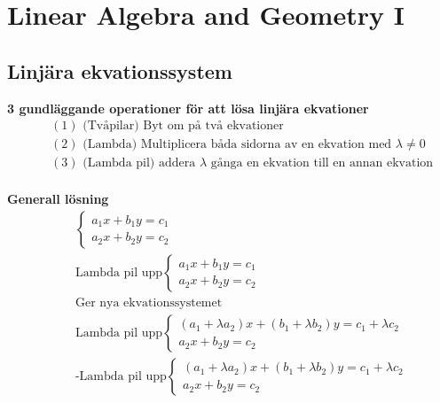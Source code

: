 \chapter{Linear Algebra and Geometry I}

\newpage

\section{Linjära ekvationssystem}

\textbf{3 gundläggande operationer för att lösa linjära ekvationer}
\begin{align*}
  &\quad (1) \text{ (Tvåpilar) Byt om på två ekvationer} \\
  &\quad (2) \text{ (Lambda) Multiplicera båda sidorna av en ekvation med } \lambda \neq 0 \\
  &\quad (3) \text{ (Lambda pil) addera } \lambda
  \text{ gånga en ekvation till en annan ekvation} \\  
\end{align*}


\textbf{Generall lösning}
\begin{align*}
  &\quad  \left\{\begin{array}{l}
  a_{1} x+b_{1} y=c_{1} \\
  a_{2} x+b_{2} y=c_{2}
  \end{array}\right. \\
  &\quad  \text{Lambda pil upp}\left\{\begin{array}{l}
  a_{1} x+b_{1} y=c_{1} \\
  a_{2} x+b_{2} y=c_{2}
  \end{array}\right. \\
  &\quad  \text{Ger nya ekvationssystemet} \\
  &\quad  \text{Lambda pil upp}\left\{\begin{array}{l}
  (a_{1}+\lambda a_{2})x + (b_{1}+\lambda b_{2})y=c_{1} + \lambda c_{2} \\
  a_{2} x+b_{2} y=c_{2}
  \end{array}\right. \\
  &\quad  \text{-Lambda pil upp}\left\{\begin{array}{l}
  (a_{1}+\lambda a_{2})x + (b_{1}+\lambda b_{2})y=c_{1} + \lambda c_{2} \\
  a_{2} x+b_{2} y=c_{2}
  \end{array}\right. \\
  &\quad
\end{align*}

